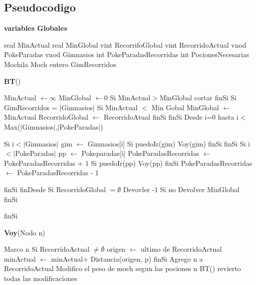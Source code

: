 \documentclass[spanish,12pt]{article}
\begin{document}

\subsection{Pseudocodigo}

\begin{algorithm}[H]{\textbf{variables Globales}}
	\begin{algorithmic}[1]
		\State real MinActual 
		\State real MinGlobal
		\State vint RecorrifoGlobal
		\State vint RecorridoActual
		\State vnod PokeParadas
		\State vnod Gimnasios
		\State int PokeParadasRecorridas
		\State int PocionesNecesarias		
		\State Mochila Moch	
		\State entero GimRecorridos	
	
	\end{algorithmic}
\end{algorithm}

\begin{algorithm}[H]{\textbf{BT}()}
	\begin{algorithmic}[1]
		\State MinActual $\gets \infty$
		\State MinGlobal $\gets 0$
		\State Si  MinActual$>$MinGlobal  
			 \State \quad cortar
		\State finSi
		\State Si GimRecorridos = $|$Gimnasios$|$ 
		\State \quad Si MinActual $<$ Min Gobal
		\State \qquad MinGlobal $\gets$ MinActual
		\State \qquad RecorridoGlobal $\gets$ RecorridoAtual
		\State \quad finSi
		\State finSi
		\State Desde i=0 hasta i$<$Max($|$Gimnasios$|$,$|$PokeParadas$|$)
	
		\State \qquad Si i$< |$Gimnasios$|$
		\State \qquad \quad gim $\gets$ Gimnasios[i]
		\State \qquad \quad Si puedoIr(gim)
		\State \qquad \qquad Voy(gim)
 		\State \qquad finSi	
		\State \quad finSi
		\State \quad Si i $< |$PokeParadas$|$
		\State \quad pp $\gets$ Pokeparadas[i]
		\State \quad PokeParadasRecorridas $\gets$ PokeParadasRecorridas + 1 
		\State \qquad Si puedoIr(pp)
		\State \qquad Voy(pp) 	
		\State \qquad finSi
		\State \quad PokeParadasRecorridas $\gets$ PokeParadasRecorridas - 1 

		\State \quad finSi 
		\State finDesde
		\State Si RecorridoGlobal $= \emptyset$
		\State \quad Devovler -1
		\State Si no
		\State \quad Devolver MinGlobal
		\State finSi
  		
		
		
		\State finSi
	\end{algorithmic}
\end{algorithm}

\begin{algorithm}[H]{\textbf{Voy}(Nodo n)}
	\begin{algorithmic}[1]
		\State Marco n
		\State Si RecorridoActual $ \not= \emptyset$
		\State \quad origen $\gets$ ultimo de RecorridoActual
		\State \quad minActual $\gets$ minActual+ Distancia(origen, p)
		\State finSi
		\State Agrego n a RecorridoActual
		\State Modifico el peso de moch segun las pociones n
		\State BT()
		\State revierto todas las modificaciones
	\end{algorithmic}
\end{algorithm}
\end{document}
